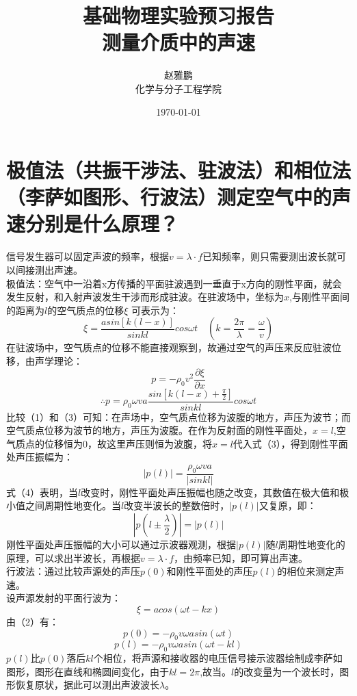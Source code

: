 \documentclass{article}
\title{{\Huge{\textbf{基础物理实验预习报告}}}\\测量介质中的声速}
\author{赵雅鹏\qquad2100011762\\化学与分子工程学院}
\date{\today}
\begin{document}
\maketitle

\setcounter{page}{1}
\newpage
{}
\setcounter{page}{1}
\setcounter{page}{1}

\section{极值法（共振干涉法、驻波法）和相位法（李萨如图形、行波法）测定空气中的声速分别是什么原理？}
信号发生器可以固定声波的频率，根据$v=\lambda\cdot f$已知频率，则只需要测出波长就可以间接测出声速。\\
极值法：空气中一沿着x方传播的平面驻波遇到一垂直于x方向的刚性平面，就会发生反射，和入射声波发生干涉而形成驻波。在驻波场中，坐标为$x$,与刚性平面间的距离为$l$的空气质点的位移$\xi$ 可表示为：\\
\begin{equation}
\xi = \dfrac{asin[k(l-x)]}{sinkl}cos\omega t\quad(k=\dfrac{2\pi}{\lambda}=\dfrac{\omega}{v})
\end{equation}
在驻波场中，空气质点的位移不能直接观察到，故通过空气的声压来反应驻波位移，由声学理论：\\
\begin{equation}
p=-\rho_0v^2\dfrac{\partial \xi}{\partial x}
\end{equation}
\begin{equation}
\therefore p=\rho_0 \omega va\dfrac{sin[k(l-x)+\frac{\pi}{2}]}{sin kl}cos\omega t
\end{equation}
比较（1）和（3）可知：在声场中，空气质点位移为波腹的地方，声压为波节；而空气质点位移为波节的地方，声压为波腹。在作为反射面的刚性平面处，$x=l$,空气质点的位移恒为0，故这里声压则恒为波腹，将$x=l$代入式（3），得到刚性平面处声压振幅为：
\begin{equation}
|p(l)|=\dfrac{\rho_0 \omega va}{|sinkl|}
\end{equation}
式（4）表明，当$l$改变时，刚性平面处声压振幅也随之改变，其数值在极大值和极小值之间周期性地变化。当$l$改变半波长的整数倍时，$|p(l)|$又复原，即：
\begin{equation}
|p(l\pm\dfrac{\lambda}{2})|=|p(l)|
\end{equation}
刚性平面处声压振幅的大小可以通过示波器观测，根据$|p(l)|$随$l$周期性地变化的原理，可以求出半波长，再根据$v=\lambda\cdot f$，由频率已知，即可算出声速。\\
行波法：通过比较声源处的声压$p(0)$和刚性平面处的声压$p(l)$的相位来测定声速。\\
设声源发射的平面行波为：
\begin{equation}
\xi = acos(\omega t-kx)
\end{equation}
由（2）有：
\begin{equation}
p(0)=-\rho_0v\omega asin(\omega t)
\end{equation}
\begin{equation}
p(l)=-\rho_0v\omega asin(\omega t-kl)
\end{equation}
$p(l)$比$p(0)$落后$kl$个相位，将声源和接收器的电压信号接示波器绘制成李萨如图形，图形在直线和椭圆间变化，由于$kl=2\pi$,故当。$l$的改变量为一个波长时，图形恢复原状，据此可以测出声波波长$\lambda$。
\end{document}
